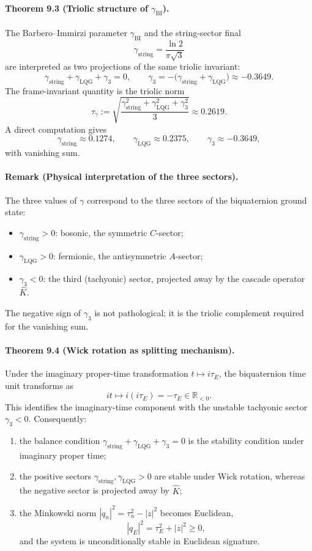 \documentclass[12pt,a4paper]{article}
\begin{document}
\paragraph*{Theorem 9.3 (Triolic structure of $\gamma_{\mathrm{BI}}$).}
The Barbero--Immirzi parameter $\gamma_{\mathrm{BI}}$ and the string-sector final
\[
\gamma_{\mathrm{string}} = \frac{\ln 2}{\pi\sqrt{3}}
\]
are interpreted as two projections of the same triolic invariant:
\[
\gamma_{\mathrm{string}} + \gamma_{\mathrm{LQG}} + \gamma_3 = 0,
\qquad
\gamma_3 = -\bigl(\gamma_{\mathrm{string}} + \gamma_{\mathrm{LQG}}\bigr) \approx -0.3649.
\]
The frame-invariant quantity is the triolic norm
\[
\tau_\gamma := \sqrt{\frac{\gamma_{\mathrm{string}}^2 + \gamma_{\mathrm{LQG}}^2 + \gamma_3^2}{3}} \approx 0.2619.
\]
A direct computation gives
\[
\gamma_{\mathrm{string}} \approx 0.1274, \qquad \gamma_{\mathrm{LQG}} \approx 0.2375, \qquad \gamma_3 \approx -0.3649,
\]
with vanishing sum.

\paragraph*{Remark (Physical interpretation of the three sectors).}
The three values of $\gamma$ correspond to the three sectors of the biquaternion ground state:
\begin{itemize}
 \item $\gamma_{\mathrm{string}} > 0$: bosonic, the symmetric $C$-sector;
 \item $\gamma_{\mathrm{LQG}} > 0$: fermionic, the antisymmetric $A$-sector;
 \item $\gamma_3 < 0$: the third (tachyonic) sector, projected away by the cascade operator $\hat K$.
\end{itemize}
The negative sign of $\gamma_3$ is not pathological; it is the triolic complement required for the vanishing sum.

\paragraph*{Theorem 9.4 (Wick rotation as splitting mechanism).}
Under the imaginary proper-time transformation $t \mapsto i\tau_E$, the biquaternion time unit transforms as
\[
it \mapsto i(i\tau_E) = -\tau_E \in \mathbb{R}_{<0}.
\]
This identifies the imaginary-time component with the unstable tachyonic sector $\gamma_3<0$. Consequently:
\begin{enumerate}
 \item the balance condition $\gamma_{\mathrm{string}}+\gamma_{\mathrm{LQG}}+\gamma_3=0$ is the stability condition under imaginary proper time;
 \item the positive sectors $\gamma_{\mathrm{string}}, \gamma_{\mathrm{LQG}}>0$ are stable under Wick rotation, whereas the negative sector is projected away by $\hat K$;
 \item the Minkowski norm $|q_n|^2=\tau_n^2-|z|^2$ becomes Euclidean,
 \[
 |q_E|^2 = \tau_E^2 + |z|^2 \ge 0,
 \]
 and the system is unconditionally stable in Euclidean signature.
\end{enumerate}
\end{document}
